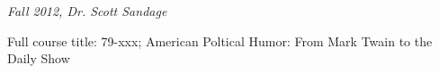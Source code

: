 \textit{Fall 2012, Dr. Scott Sandage}

Full course title: 79-xxx; American Poltical Humor: From Mark Twain to the
Daily Show





\groupendnotes

